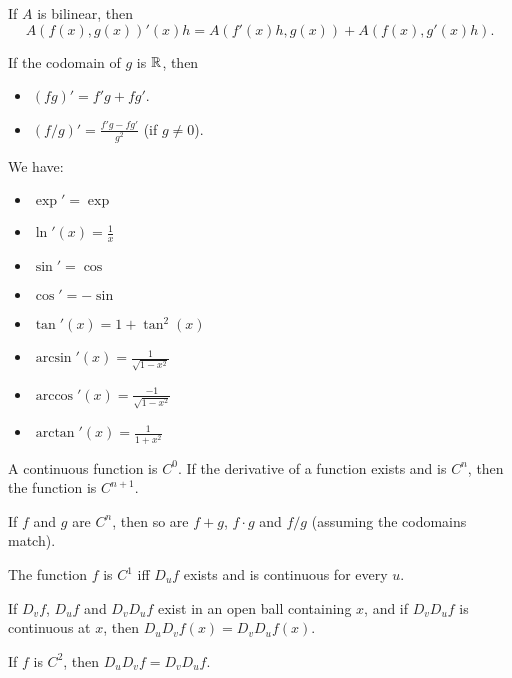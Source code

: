 \begin{prop}
    If $A$ is bilinear, then
    \[A(f(x),g(x))'(x)h=A(f'(x)h,g(x))+A(f(x),g'(x)h).\]
\end{prop}
\begin{cor}
    If the codomain of $g$ is $\mathbb{R}$, then
    \begin{itemize}
        \item $(fg)'=f'g+fg'$.
        \item $(f/g)'=\frac{f'g-fg'}{g^2}$ (if $g\ne 0$).
    \end{itemize}
\end{cor}
\begin{prop}
    We have:
    \begin{itemize}
        \item $\exp'=\exp$
        \item $\ln'(x)=\frac 1x$
        \item $\sin'=\cos$
        \item $\cos'=-\sin$
        \item $\tan'(x)=1+\tan^2(x)$
        \item $\arcsin'(x)=\frac 1{\sqrt{1-x^2}}$
        \item $\arccos'(x)=\frac{-1}{\sqrt{1-x^2}}$
        \item $\arctan'(x)=\frac 1{1+x^2}$
    \end{itemize}
\end{prop}
\begin{defn}
    A continuous function is $C^0$. If the derivative of a function exists and
    is $C^n$, then the function is $C^{n+1}$.
\end{defn}
\begin{prop}
    If $f$ and $g$ are $C^n$, then so are $f+g$, $f\cdot g$ and $f/g$ (assuming
    the codomains match).
\end{prop}
\begin{prop}
    The function $f$ is $C^1$ iff $D_u f$ exists and is continuous for every $u$.
\end{prop}
\begin{prop}
    If $D_v f$, $D_u f$ and $D_v D_u f$ exist in an open ball containing $x$,
    and if $D_v D_u f$ is continuous at $x$, then $D_u D_v f(x)=D_v D_u f(x)$.
\end{prop}
\begin{cor}
    If $f$ is $C^2$, then $D_u D_v f = D_v D_u f$.
\end{cor}
